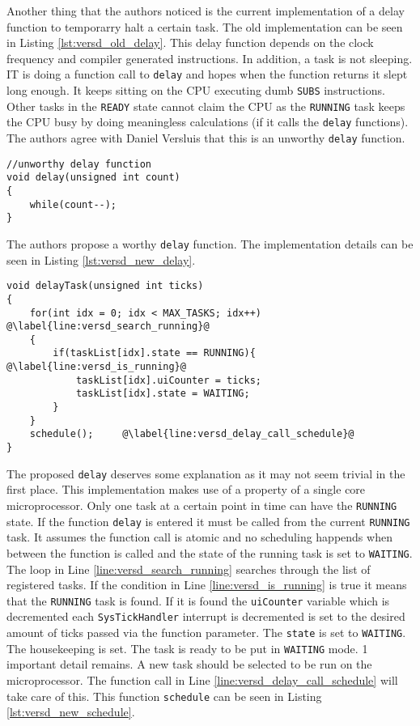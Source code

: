 Another thing that the authors noticed is the current implementation of a delay function to temporarry halt a certain task.
The old implementation can be seen in Listing \ref{lst:versd_old_delay}.
This delay function depends on the clock frequency and compiler generated instructions.
In addition, a task is not sleeping. IT is doing a function call to \texttt{delay} and hopes when the function returns it slept long enough.
It keeps sitting on the CPU executing dumb \texttt{SUBS} instructions.
Other tasks in the \texttt{READY} state cannot claim the CPU as the \texttt{RUNNING} task keeps the CPU busy by doing meaningless calculations (if it calls the \texttt{delay} functions).
The authors agree with Daniel Versluis that this is an unworthy \texttt{delay} function.
\begin{lstlisting}[style=CStyle, caption={An unworthy delay function, according to Daniel Versluis}, captionpos=b, label={lst:versd_old_delay}, escapechar=@]
//unworthy delay function
void delay(unsigned int count)
{
    while(count--);
}

\end{lstlisting}

The authors propose a worthy \texttt{delay} function. The implementation details can be seen in Listing \ref{lst:versd_new_delay}.


\newpage
\begin{lstlisting}[style=CStyle, caption={A worhy \texttt{delay} function, according to the authors}, captionpos=b, label={lst:versd_new_delay}, escapechar=@]
void delayTask(unsigned int ticks)
{
    for(int idx = 0; idx < MAX_TASKS; idx++)    @\label{line:versd_search_running}@
    {
        if(taskList[idx].state == RUNNING){     @\label{line:versd_is_running}@
            taskList[idx].uiCounter = ticks;
            taskList[idx].state = WAITING;
        }
    }
    schedule();     @\label{line:versd_delay_call_schedule}@
}
\end{lstlisting}

The proposed \texttt{delay} deserves some explanation as it may not seem trivial in the first place.
This implementation makes use of a property of a single core microprocessor.
Only one task at a certain point in time can have the \texttt{RUNNING} state.
If the function \texttt{delay} is entered it must be called from the current \texttt{RUNNING} task.
It assumes the function call is atomic and no scheduling happends when between the function is called and the state of the running task is set to \texttt{WAITING}.
The loop in Line \ref{line:versd_search_running} searches through the list of registered tasks.
If the condition in Line \ref{line:versd_is_running} is true it means that the \texttt{RUNNING} task is found.
If it is found the \texttt{uiCounter} variable which is decremented each \texttt{SysTickHandler} interrupt is decremented is set to the desired amount of ticks passed via the function parameter.
The \texttt{state} is set to \texttt{WAITING}.
The housekeeping is set. The task is ready to be put in \texttt{WAITING} mode.
1 important detail remains.
A new task should be selected to be run on the microprocessor.
The function call in Line \ref{line:versd_delay_call_schedule} will take care of this.
This function \texttt{schedule} can be seen in Listing \ref{lst:versd_new_schedule}.

